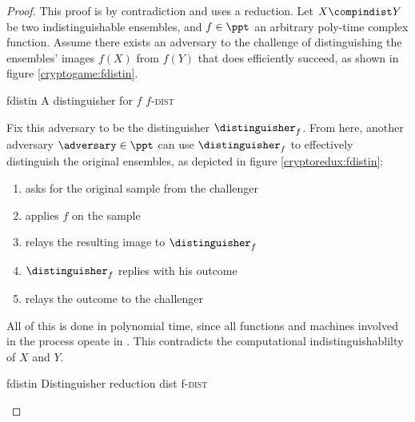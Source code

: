 \begin{proof}
    This proof is by contradiction and uses a reduction. Let $X \compindist Y$ be two indistinguishable ensembles, and $f \in \ppt$ an arbitrary poly-time complex function. Assume there exists an adversary \adversary{} to the challenge of distinguishing the ensembles' images $f(X)$ from $f(Y)$ that does efficiently succeed, as shown in figure \ref{cryptogame:fdistin}. 
    
    \begin{cryptogame}
        {fdistin}
        {A distinguisher for $f$}
        {$f$-\textsc{dist}}


        \cseqdelay


    \end{cryptogame}
    
    Fix this adversary to be the distinguisher $\distinguisher_f$. From here, another adversary $\adversary \in \ppt$ can use $\distinguisher_f$ to effectively distinguish the original ensembles, as depicted in figure \ref{cryptoredux:fdistin}:
    \begin{enumerate}
        \item \adversary{} asks for the original sample from the challenger
        \item \adversary{} applies $f$ on the sample
        \item \adversary{} relays the resulting image to $\distinguisher_f$
        \item $\distinguisher_f$ replies with his outcome
        \item \adversary{} relays the outcome to the challenger
    \end{enumerate}
    All of this is done in polynomial time, since all functions and machines involved in the process opeate in \ppt. This contradicts the computational indistinguishablilty of $X$ and $Y$.

    \begin{cryptoredux}
        {fdistin}
        {Distinguisher reduction}
        {dist}
        {f-\textsc{dist}}
        

\end{cryptoredux}
\end{proof}
